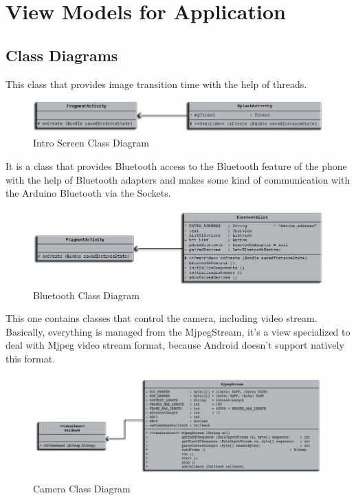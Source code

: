 \documentclass[11pt]{article}
\begin{document}
\pagebreak


\section{View Models for Application}
\subsection{Class Diagrams}
\begin{flushleft}
This class that provides image transition time with the help of threads.
\end{flushleft}
\begin{figure}[h]
\centering
\includegraphics[scale=0.45]{Splash_class_diagram2.png}
\caption{Intro Screen Class Diagram}
\end{figure}

\begin{flushleft}
It is a class that provides Bluetooth access to the Bluetooth feature of the phone with the help of Bluetooth adapters and makes some kind of communication with the Arduino Bluetooth via the Sockets.
\end{flushleft}
\begin{figure}[h]
\centering
\includegraphics[scale=0.45]{Bluetooth_class_diagram2.png}
\caption{Bluetooth Class Diagram}
\end{figure}

\begin{flushleft}
This one contains classes that control the camera, including  video stream. Basically, everything is managed from the MjpegStream, it’s a view specialized to deal with Mjpeg video stream format, because Android doesn’t support natively this format.
\end{flushleft}
\begin{figure}[h]
\centering
\includegraphics[scale=0.40]{Camera_class_diagram2.png}
\caption{Camera Class Diagram}
\end{figure}
\end{document}
